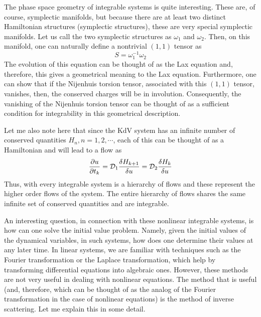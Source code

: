\documentclass[a4paper,11pt]{article}
\begin{document}
The phase space geometry of integrable systems is quite
interesting. These are, of course, symplectic manifolds, but because
there are at least two distinct Hamiltonian structures (symplectic
structures), these are very special symplectic manifolds. Let us call
the two symplectic structures as $\omega_{1}$ and $\omega_{2}$. Then,
on this manifold, one can naturally define a nontrivial $(1,1)$ tensor
as
\begin{equation}
S = \omega_{1}^{-1} \omega_{2}
\end{equation}
The evolution of this equation can be thought of as the Lax equation
and, therefore, this gives a geometrical meaning to the Lax
equation. Furthermore, one can show that if the Nijenhuis torsion
tensor, associated with this $(1,1)$ tensor, vanishes, then, the
conserved charges will be in involution. Consequently, the vanishing
of the Nijenhuis torsion tensor can be thought of as a sufficient
condition for integrability in this geometrical description.  

Let me also note here that since the KdV system has an infinite number
of conserved quantities $H_{n}, n=1,2,\cdots $, each of this can be
thought of as a Hamiltonian and will lead to a flow as
\begin{equation}
{\partial u\over \partial t_{k}} = {\cal D}_{1} {\delta H_{k+1}\over
\delta u} = {\cal D}_{2} {\delta H_{k}\over \delta u}
\end{equation}
Thus, with every integrable system is a hierarchy of flows and these
represent the higher order flows of the system. The entire hierarchy
of flows shares the same infinite set of conserved quantities and are
integrable. 


An interesting question, in connection with these nonlinear integrable
systems, is how can one solve the initial value problem. Namely, given
the initial values of the dynamical variables, in such systems, how
does one determine their values at any later time. In linear systems,
we are familiar with techniques such as the Fourier transformation or
the Laplace transformation, which help by transforming differential
equations into algebraic ones. However, these methods are not very
useful in dealing with nonlinear equations. The method that is useful
(and, therefore, which can be thought of as the analog of the Fourier
transformation in the case of nonlinear equations) is the method of
inverse scattering. Let me explain this in some detail.
\end{document}
